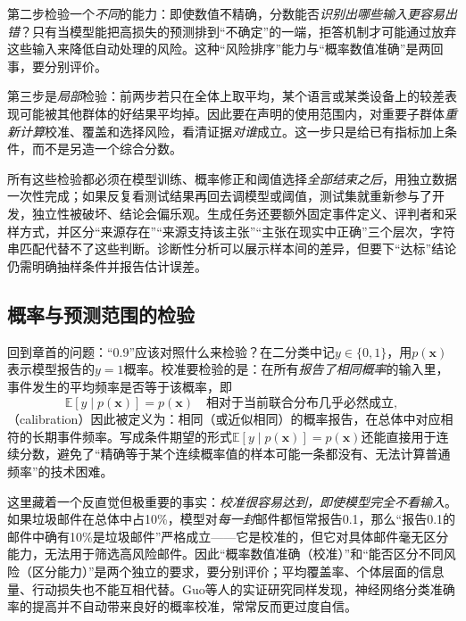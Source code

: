 第二步检验一个\emph{不同}的能力：即使数值不精确，分数能否\emph{识别出哪些输入更容易出错}？只有当模型能把高损失的预测排到“不确定”的一端，拒答机制才可能通过放弃这些输入来降低自动处理的风险。这种“风险排序”能力与“概率数值准确”是两回事，要分别评价。

第三步是\emph{局部}检验：前两步若只在全体上取平均，某个语言或某类设备上的较差表现可能被其他群体的好结果平均掉。因此要在声明的使用范围内，对重要子群体\emph{重新计算}校准、覆盖和选择风险，看清证据\emph{对谁}成立。这一步只是给已有指标加上条件，而不是另造一个综合分数。

所有这些检验都必须在模型训练、概率修正和阈值选择\emph{全部结束之后}，用独立数据一次性完成；如果反复看测试结果再回去调模型或阈值，测试集就重新参与了开发，独立性被破坏、结论会偏乐观。生成任务还要额外固定事件定义、评判者和采样方式，并区分“来源存在”“来源支持该主张”“主张在现实中正确”三个层次，字符串匹配代替不了这些判断。诊断性分析可以展示样本间的差异，但要下“达标”结论仍需明确抽样条件并报告估计误差。

\subsection{概率与预测范围的检验}
\label{sec:reliability-output-evaluation}

回到章首的问题：“0.9”应该对照什么来检验？在二分类中记$y\in\{0,1\}$，用$p(\bm{x})$表示模型报告的$y=1$概率。校准要检验的是：在所有\emph{报告了相同概率}的输入里，事件发生的平均频率是否等于该概率，即
\begin{equation}
 \mathbb E[y\mid p(\bm{x})]=p(\bm{x})
\quad\text{相对于当前联合分布几乎必然成立},
 \label{eq:reliability-calibration}
\end{equation}
（calibration）因此被定义为：相同（或近似相同）的概率报告，在总体中对应相符的长期事件频率。写成条件期望的形式$\mathbb E[y\mid p(\bm{x})]=p(\bm{x})$还能直接用于连续分数，避免了“精确等于某个连续概率值的样本可能一条都没有、无法计算普通频率”的技术困难。

这里藏着一个反直觉但极重要的事实：\emph{校准很容易达到，即使模型完全不看输入}。如果垃圾邮件在总体中占10\%，模型对\emph{每一封}邮件都恒常报告0.1，那么“报告0.1的邮件中确有10\%是垃圾邮件”严格成立——它是校准的，但它对具体邮件毫无区分能力，无法用于筛选高风险邮件。因此“概率数值准确（校准）”和“能否区分不同风险（区分能力）”是两个独立的要求，要分别评价；平均覆盖率、个体层面的信息量、行动损失也不能互相代替。Guo等人的实证研究同样发现，神经网络分类准确率的提高并不自动带来良好的概率校准，常常反而更过度自信。

